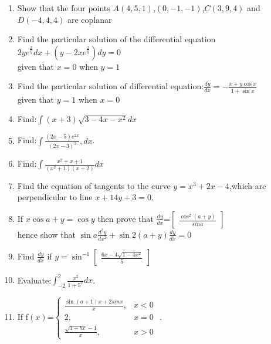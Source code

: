 \documentclass[12pt,-letter paper]{article}
\providecommand{\myvec}[1]{\ensuremath{\begin{bmatrix}#1\end{bmatrix}}}
\providecommand{\brak}[1]{\ensuremath{\left(#1\right)}}
\begin{document}
\begin{enumerate}
	\item Show that the four points $A\brak{4,5,1}$,$\brak{0,-1,-1}$,$C\brak{3,9,4}$ and $D\brak{-4,4,4}$ are coplanar



\item Find the particular solution of the differential equation $2ye^\frac{x}{y}dx+\brak{{y-2xe^\frac{x}{y}}}dy=0$\\given that $x=0$  when $y=1$




\item Find the particular solution of differential equation:$\frac{dy}{dx}=-\frac{x+y\cos x}{1+\sin x}$\\ given that $y=1$ when $x=0$ 


    \item Find:$\int{\brak{x+3}}\sqrt{3-4x-x^2}dx$      



\item Find:$\int\frac{\brak{2x-5}e^2{}^x}{\brak{2x-3}^3},dx$.


\item Find:$\int\frac{x^2+x+1}{\brak{x^2+1}\brak
	{x+2}}dx$


  \item Find the equation of tangents to the curve $y=x^3+2x-4$,which are perpendicular to line $x+14y+3=0$.
		  
  \item If $x\cos{a+y}=\cos{y}$ then prove that $\frac{dy}{dx}$=$\myvec{\frac{\cos^2 \brak{a+y}}{sina}}$\\
	  hence show that $\sin a\frac{d^{2}y}{dx^2}+\sin2\brak{a+y}\frac{dy}{dx}=0$

   
  \item Find $\frac{dy}{dx}$ if $y=\sin^{-1}\myvec{\frac{6x-4\sqrt{1-4x^2}}{5}}$



  \item Evaluate:$\int_{-2}^{2}\frac{x^2}{1+5^x}dx$.

  \item If f\brak{x}=$\begin{cases}
		  \frac{\sin(a+1)x+2 sinx}{x},&x<0\\
		  2,  &x=0\\ \frac{\sqrt{1+bx}-1}{x},&x>0
  \end{cases}$ .





\end{enumerate}
\end{document}
